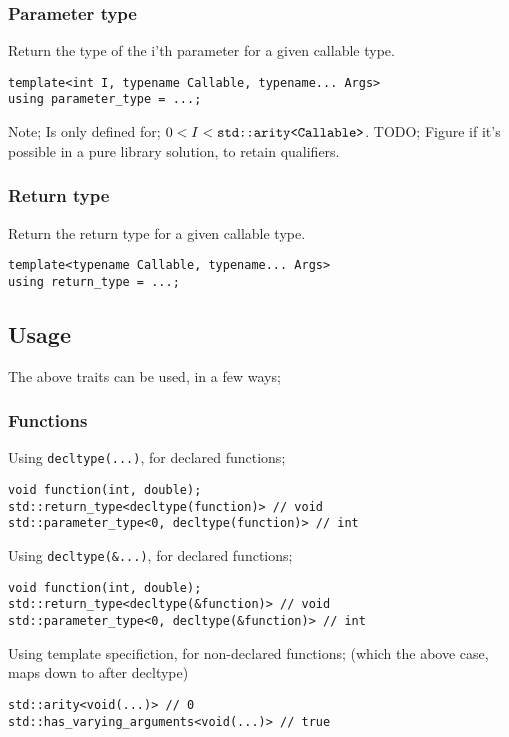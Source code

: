 \subsubsection{Parameter type}
Return the type of the i'th parameter for a given callable type.
\begin{verbatim}
template<int I, typename Callable, typename... Args>
using parameter_type = ...;
\end{verbatim}
Note; Is only defined for; $0 < I < \verb|std::arity<Callable>|$.
\newline
TODO; Figure if it's possible in a pure library solution, to retain qualifiers. 

\subsubsection{Return type}
Return the return type for a given callable type.
\begin{verbatim}
template<typename Callable, typename... Args>
using return_type = ...;
\end{verbatim}

\subsection{Usage}
The above traits can be used, in a few ways;
\subsubsection{Functions}
Using \verb|decltype(...)|, for declared functions;
\begin{verbatim}
void function(int, double);
std::return_type<decltype(function)> // void
std::parameter_type<0, decltype(function)> // int
\end{verbatim}
Using \verb|decltype(&...)|, for declared functions;
\begin{verbatim}
void function(int, double);
std::return_type<decltype(&function)> // void
std::parameter_type<0, decltype(&function)> // int
\end{verbatim}
Using template specifiction, for non-declared functions;
(which the above case, maps down to after decltype)
\begin{verbatim}
std::arity<void(...)> // 0
std::has_varying_arguments<void(...)> // true
\end{verbatim}

